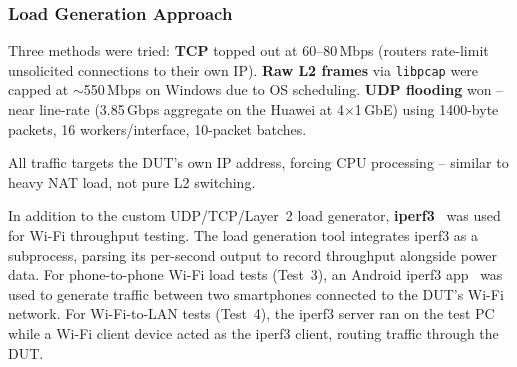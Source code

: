 \documentclass[a4paper,oneside,10pt,ngerman,english]{scrartcl}
\begin{document}
    \subsubsection{Load Generation Approach}
    Three methods were tried: \textbf{TCP} topped out at 60--80\,Mbps (routers rate-limit unsolicited connections to their own IP). \textbf{Raw L2 frames} via \texttt{libpcap} were capped at $\sim$550\,Mbps on Windows due to OS scheduling. \textbf{UDP flooding} won -- near line-rate (3.85\,Gbps aggregate on the Huawei at 4$\times$1\,GbE) using 1400-byte packets, 16 workers/interface, 10-packet batches.

    All traffic targets the DUT's own IP address, forcing CPU processing -- similar to heavy NAT load, not pure L2 switching.

    In addition to the custom UDP/TCP/Layer~2 load generator, \textbf{iperf3}~\cite{bib:iperf3} was used for Wi-Fi throughput testing.
    The load generation tool integrates iperf3 as a subprocess, parsing its per-second output to record throughput alongside power data.
    For phone-to-phone Wi-Fi load tests (Test~3), an Android iperf3 app~\cite{bib:iperf3-android} was used to generate traffic between two smartphones connected to the DUT's Wi-Fi network.
    For Wi-Fi-to-LAN tests (Test~4), the iperf3 server ran on the test PC while a Wi-Fi client device acted as the iperf3 client, routing traffic through the DUT.








\newpage
\printbibliography





\cleardoubleoddpage
\end{document}
